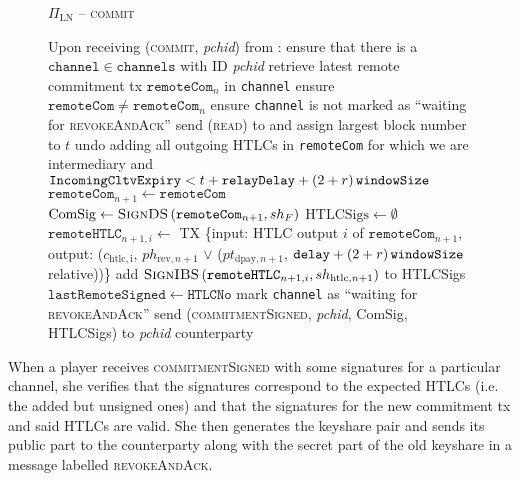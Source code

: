   \begin{figure}[H]
    \begin{protocolbox}{$\Pi_{\mathrm{LN}}$ -- \textsc{commit}}
      \begin{algorithmic}[1]
        \State Upon receiving (\textsc{commit}, \textit{pchid}) from
        \environment:
        \Indent
          \State ensure that there is a $\mathtt{channel} \in \mathtt{channels}$
          with ID \textit{pchid}
          \State retrieve latest remote commitment tx $\mathtt{remoteCom}_n$ in
          \texttt{channel}
          \State ensure $\mathtt{remoteCom} \neq \mathtt{remoteCom}_n$
          \State ensure \texttt{channel} is not marked as ``waiting for
          \textsc{revokeAndAck}''
          \label{alg:protocol:pay:commit:nomark}
          \State send (\textsc{read}) to \ledger{} and assign largest block
          number to $t$
          \State undo adding all outgoing HTLCs in \texttt{remoteCom} for which
          we are intermediary and $\mathtt{IncomingCltvExpiry} < t +
          \mathtt{relayDelay} + \left(2 + r\right)\texttt{windowSize}$
          \State $\mathtt{remoteCom}_{n+1} \gets \mathtt{remoteCom}$
          \State $\mathrm{ComSig} \gets
          \textsc{SignDS}\left(\mathtt{remoteCom}_{n+1}, sh_F\right)$
          \State $\mathrm{HTLCSigs} \gets \emptyset$
            \State $\mathtt{remoteHTLC}_{n+1, i} \gets$ TX \{input: HTLC output
            $i$ of $\mathtt{remoteCom}_{n+1}$, output: ($c_{\mathrm{htlc, i}}$,
            $ph_{\mathrm{rev}, n+1}$ $\vee$ ($pt_{\mathrm{dpay}, n+1}$,
            $\mathtt{delay} + \left(2 + r\right)\texttt{windowSize}{}$ relative))\}
            \State add $\textsc{SignIBS}\left(\mathtt{remoteHTLC}_{n+1, i},
            sh_{\mathrm{htlc}, n+1}\right)$ to HTLCSigs
          \EndFor
          \State $\mathtt{lastRemoteSigned} \gets \mathtt{HTLCNo}$
          \State mark \texttt{channel} as ``waiting for \textsc{revokeAndAck}''
          \label{alg:protocol:pay:commit:mark}
          \State send (\textsc{commitmentSigned}, \textit{pchid}, ComSig,
          HTLCSigs) to \textit{pchid} counterparty
        \EndIndent
      \end{algorithmic}
    \end{protocolbox}
    \caption{}
    \label{alg:protocol:pay:commit}
  \end{figure}

  When a player receives \textsc{commitmentSigned} with some signatures for a
  particular channel, she verifies that the signatures correspond to the
  expected HTLCs (i.e. the added but unsigned ones) and that the signatures for
  the new commitment tx and said HTLCs are valid. She then generates the
  keyshare pair and sends its public part to the counterparty along with the
  secret part of the old keyshare in a message labelled \textsc{revokeAndAck}.

